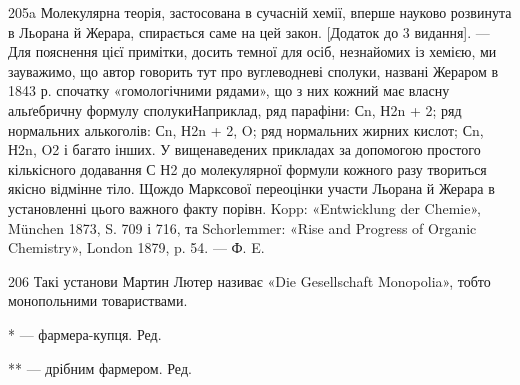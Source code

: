 205a Молекулярна теорія, застосована в сучасній хемії, вперше науково
розвинута в Льорана й Жерара, спирається саме на цей закон. [Додаток
до 3 видання]. — Для пояснення цієї примітки, досить темної для осіб,
незнайомих із хемією, ми зауважимо, що автор говорить тут про вуглеводневі
сполуки, названі Жераром в 1843 р. спочатку «гомологічними
рядами», що з них кожний має власну альґебричну формулу сполукиНаприклад,
ряд парафіни: Сn, Н2n + 2; ряд нормальних алькоголів:
Сn, Н2n + 2, O; ряд нормальних жирних кислот; Сn, Н2n, O2 і багато інших.
У вищенаведених прикладах за допомогою простого кількісного додавання
С Н2 до молекулярної формули кожного разу твориться якісно відмінне
тіло. Щождо Марксової переоцінки участи Льорана й Жерара в установленні
цього важного факту порівн. Kopp: «Entwicklung der Chemie»,
München 1873, S. 709 і 716, та Schorlemmer: «Rise and Progress of
Organic Chemistry», London 1879, p. 54. — Ф. E.

206 Такі установи Мартин Лютер називає «Die Gesellschaft Monopolia»,
тобто монопольними товариствами.

* — фармера-купця. Ред.

** — дрібним фармером. Ред.
